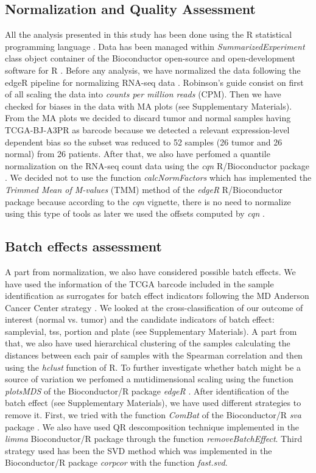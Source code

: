\documentclass[9pt,twocolumn,twoside]{gsajnl}
\begin{document}
\subsection*{Normalization and Quality Assessment}
All the analysis presented in this study has been done using the R statistical programming language \citep{R}. Data has been managed within \textit{SummarizedExperiment} class object container \citep{SummarizedExperiment} of the Bioconductor open-source and open-development software for R \citep{Gentleman2004}. Before any analysis, we have normalized the data following the edgeR pipeline for normalizing RNA-seq data \citep{Robinson2010}. Robinson's guide consist on first of all scaling the data into \textit{counts per million reads} (CPM). Then we have checked for biases in the data with MA plots (see Supplementary Materials). From the MA plots we decided to discard tumor and normal samples having  TCGA-BJ-A3PR as barcode because we detected a relevant expression-level dependent bias so the subset was reduced to 52 samples (26 tumor and 26 normal) from 26 patients. After that, we also have perfomed a quantile normalization on the RNA-seq count data using the \textit{cqn} R/Bioconductor package \citep{Hansen2012}. We decided not to use the function \textit{calcNormFactors} which has implemented the \textit{Trimmed Mean of M-values} (TMM) method of the \textit{edgeR} R/Bioconductor package \citep{Robinson2010a} because according to the \textit{cqn} vignette, there is no need to normalize using this type of tools as later we used the offsets computed by \textit{cqn} \citep{Hansen2012}. 

\subsection*{Batch effects assessment}
A part from normalization, we also have considered possible batch effects. We have used the information of the TCGA barcode included in the sample identification as surrogates for batch effect indicators following the MD Anderson Cancer Center strategy \citep{batch}. We looked at the cross-classification of our outcome of interest (normal vs. tumor) and the candidate indicators of batch effect: samplevial, tss, 
portion and plate (see Supplementary Materials). A part from that, we also have used hierarchical clustering of the samples calculating the distances between each pair of samples with the Spearman correlation and then using the \textit{hclust} function of R. To further investigate whether batch might be a source of variation we perfomed a mutidimensional scaling using the function \textit{plotsMDS} of the Bioconductor/R package \textit{edgeR} \citep{Robinson2010}. After identification of the batch effect (see Supplementary Materials), we have used different strategies to remove it. First, we tried with the function \textit{ComBat} of the Bioconductor/R \textit{sva} package \citep{sva}. We also have used QR descomposition technique implemented in the \textit{limma} Bioconductor/R package \citep{limma} through the function \textit{removeBatchEffect}. Third strategy used has been the SVD method \citep{Alter2000} which was implemented in the Bioconductor/R package \textit{corpcor} \citep{corpcor} with the function \textit{fast.svd}.
\end{document}

